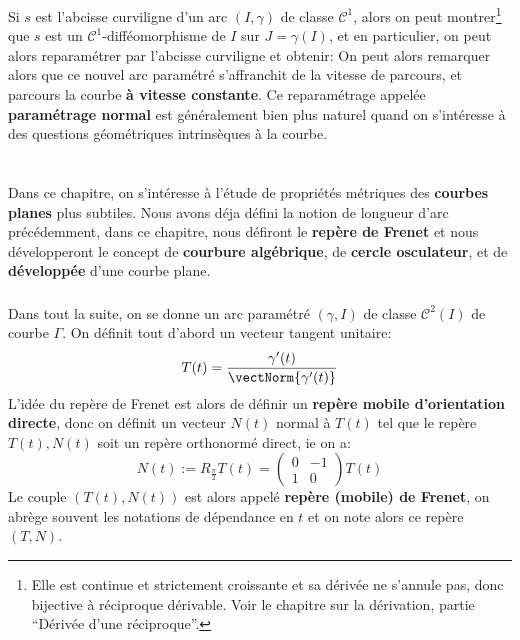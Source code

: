 \subsection*{}
Si \(s\) est l'abcisse curviligne d'un arc \((I, \gamma)\) de classe \(\mathcal{C}^1\), alors on peut montrer\footnote[3]{Elle est continue et strictement croissante et sa dérivée ne s'annule pas, donc bijective à réciproque dérivable. Voir le chapitre sur la dérivation, partie ``Dérivée d'une réciproque''.} que \(s\) est un \(\mathcal{C}^1\)-difféomorphisme de \(I\) sur \(J = \gamma(I)\), et en particulier, on peut alors reparamétrer par l'abcisse curviligne et obtenir:
On peut alors remarquer alors que ce nouvel arc paramétré s'affranchit de la vitesse de parcours, et parcours la courbe \textbf{à vitesse constante}. Ce reparamétrage appelée \textbf{paramétrage normal} est généralement bien plus naturel quand on s'intéresse à des questions géométriques intrinsèques à la courbe.

\chapter*{} %
Dans ce chapitre, on s'intéresse à l'étude de propriétés métriques des \textbf{courbes planes} plus subtiles. Nous avons déja défini la notion de longueur d'arc précédemment, dans ce chapitre, nous défiront le \textbf{repère de Frenet} et nous développeront le concept de \textbf{courbure algébrique}, de \textbf{cercle osculateur}, et de \textbf{développée} d'une courbe plane.

\subsection*{}
Dans tout la suite, on se donne un arc paramétré \((\gamma, I)\) de classe \(\mathcal{C}^2(I)\) de courbe \(\Gamma\). On définit tout d'abord un vecteur tangent unitaire:
\[
   T(t) = \frac{\gamma'(t)}{\vectNorm{\gamma'(t)}}
\]
L'idée du repère de Frenet est alors de définir un \textbf{repère mobile d'orientation directe}, donc on définit un vecteur \(N(t)\) normal à \(T(t)\) tel que le repère \(T(t), N(t)\) soit un repère orthonormé direct, ie on a:
\[
   N(t) := R_\frac{\pi}{2}T(t) = \begin{pmatrix} 0 & -1\\ 1 & 0\end{pmatrix} T(t) 
\]
Le couple \((T(t), N(t))\) est alors appelé \textbf{repère (mobile) de Frenet}, on abrège souvent les notations de dépendance en \(t\) et on note alors ce repère \((T, N)\).

